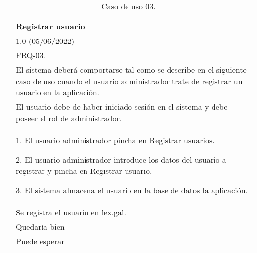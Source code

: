 \begin{table}[H]
\begin{center}
\begin{tabular}{|p{3cm}|p{10cm}|} \hline
\centering {\bf UC-03} & Registrar usuario  \\ \hline\hline
\centering {\bf Versión} & 1.0 (05/06/2022) \\ \hline
\centering {\bf Dependencias} &  FRQ-03. \\ \hline
\centering {\bf Descripción} &  El sistema deberá comportarse tal como se describe en el siguiente caso de uso cuando el usuario administrador trate de registrar un usuario en la aplicación. \\ \hline
\centering {\bf Precondición} &  El usuario debe de haber iniciado sesión en el sistema y debe poseer el rol de administrador. \\ \hline
\centering {\bf Secuencia normal} &  
1. El usuario administrador pincha en Registrar usuarios.

2. El usuario administrador introduce los datos del usuario a registrar y pincha en Registrar usuario.

3. El sistema almacena el usuario en la base de datos la aplicación.
\\ \hline
\centering {\bf Postcondición} &  Se registra el usuario en lex.gal. \\ \hline
\centering {\bf Importancia} & Quedaría bien \\ \hline
\centering {\bf Urgencia} & Puede esperar \\ \hline
\end{tabular}
\caption{Caso de uso 03.}
\label{enlaceUC3}
\end{center}
\end{table}


